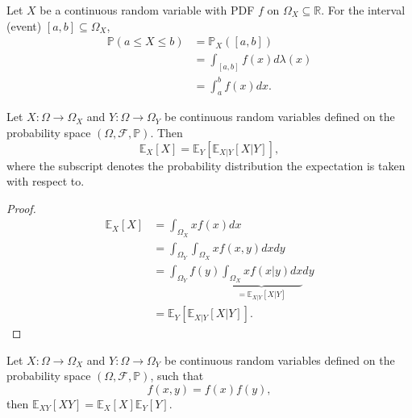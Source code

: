 \begin{example}
	Let $X$ be a continuous random variable with PDF $f$ on $\Omega_X\subseteq \mathbb{R}$. For the interval (event) $[a,b] \subseteq \Omega_X$,
	\begin{equation}
		\begin{split}
			\mathbb{P}(a \le X \le b) 
			&= \mathbb{P}_X([a,b])\\ 
			&= \int_{[a,b]} f(x) d\lambda(x)\\ 
			&= \int_a^b f(x) dx.
		\end{split}
	\end{equation}
\end{example}

\begin{theorem}
	\label{theorem:total_expectation}
	Let $X: \Omega \to \Omega_X$ and $Y: \Omega \to \Omega_Y$ be continuous random variables defined on the probability space $(\Omega, \mathcal{F}, \mathbb{P})$. Then
	\begin{equation}
		\mathbb{E}_X[X] = \mathbb{E}_Y[\mathbb{E}_{X|Y}[X| Y]],
	\end{equation}
	where the subscript denotes the probability distribution the expectation is taken with respect to.
\end{theorem}
\begin{proof}
	\begin{equation}
		\begin{split}
			\mathbb{E}_X[X] &= \int_{\Omega_X} x f(x) dx\\
			& = \int_{\Omega_Y} \int_{\Omega_X} x f(x,y) dx dy\\
			& =  \int_{\Omega_Y} f(y) \underbrace{\int_{\Omega_X}x f(x|y) dx}_{= \mathbb{E}_{X|Y}[X|Y]}dy\\
			& = \mathbb{E}_Y[\mathbb{E}_{X|Y}[X|Y]].
		\end{split}
	\end{equation}
\end{proof}

\begin{theorem}
	\label{theorem:expectation_independent}
	Let $X: \Omega \to \Omega_X$ and $Y: \Omega \to \Omega_Y$ be continuous random variables defined on the probability space $(\Omega, \mathcal{F}, \mathbb{P})$, such that
	\begin{equation}
	f(x,y)=f(x)f(y),	
	\end{equation}
	then $\mathbb{E}_{XY}[XY]=\mathbb{E}_X[X]\mathbb{E}_Y[Y]$.
\end{theorem}

